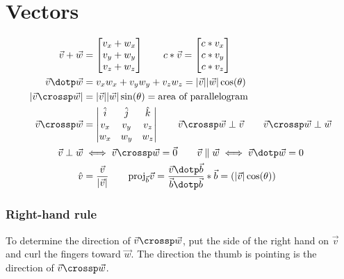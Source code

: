\section{Vectors}


\[\begin{aligned}
	\vec{v} + \vec{w} &= \begin{bmatrix}
		v_x + w_x \\
		v_y + w_y \\
		v_z + w_z \\
	\end{bmatrix} \qquad
	c * \vec{v} = \begin{bmatrix}
		c * v_x \\
		c * v_y \\
		c * v_z \\
	\end{bmatrix} \\
	\vec{v} \dotp \vec{w} &= v_x w_x + v_y w_y + v_z w_z = |\vec{v}||\vec{w}| \cos(\theta) \\
	|\vec{v} \crossp \vec{w}| &= |\vec{v}||\vec{w}| \sin(\theta) = \text{area of parallelogram}\\
	\vec{v} \crossp \vec{w} &= \begin{vmatrix}
		\hat{i} & \hat{j} & \hat{k} \\
		v_x & v_y & v_z \\
		w_x & w_y & w_z
	\end{vmatrix} \qquad \vec{v} \crossp \vec{w} \perp \vec{v} \qquad \vec{v} \crossp \vec{w} \perp \vec{w} \\
	\vec{v} \perp \vec{w} &\iff \vec{v} \crossp \vec{w} = \vec{0} \qquad \vec{v} \parallel \vec{w} \iff \vec{v} \dotp \vec{w} = 0 \\
	\hat{v} &= \frac{\vec{v}}{|\vec{v}|} \qquad
	\text{proj}_{\vec{b}} \vec{v} = \frac{\vec{v} \dotp \vec{b}}{\vec{b} \dotp \vec{b}} * \vec{b} = (|\vec{v}| \cos(\theta))
\end{aligned}\]
\subsubsection{Right-hand rule}
To determine the direction of $\vec{v} \crossp \vec{w}$, put the side of the right hand on $\vec{v}$ and curl the fingers toward $\vec{w}$. The direction the thumb is pointing is the direction of $\vec{v} \crossp \vec{w}$.
